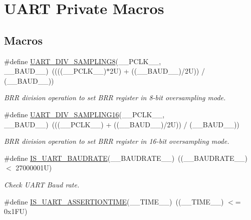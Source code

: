 \hypertarget{group___u_a_r_t___private___macros}{}\section{U\+A\+RT Private Macros}
\label{group___u_a_r_t___private___macros}
\subsection*{Macros}
\begin{DoxyCompactItemize}
\item 
\#define \mbox{\hyperlink{group___u_a_r_t___private___macros_ga3b4ab2ec164132268de4719de4625a82}{U\+A\+R\+T\+\_\+\+D\+I\+V\+\_\+\+S\+A\+M\+P\+L\+I\+N\+G8}}(\+\_\+\+\_\+\+P\+C\+L\+K\+\_\+\+\_\+,  \+\_\+\+\_\+\+B\+A\+U\+D\+\_\+\+\_\+)~((((\+\_\+\+\_\+\+P\+C\+L\+K\+\_\+\+\_\+)$\ast$2\+U) + ((\+\_\+\+\_\+\+B\+A\+U\+D\+\_\+\+\_\+)/2\+U)) / (\+\_\+\+\_\+\+B\+A\+U\+D\+\_\+\+\_\+))
\begin{DoxyCompactList}\small\item\em B\+RR division operation to set B\+RR register in 8-\/bit oversampling mode. \end{DoxyCompactList}\item 
\#define \mbox{\hyperlink{group___u_a_r_t___private___macros_gac2423ff86559eb91198bcc438caec865}{U\+A\+R\+T\+\_\+\+D\+I\+V\+\_\+\+S\+A\+M\+P\+L\+I\+N\+G16}}(\+\_\+\+\_\+\+P\+C\+L\+K\+\_\+\+\_\+,  \+\_\+\+\_\+\+B\+A\+U\+D\+\_\+\+\_\+)~(((\+\_\+\+\_\+\+P\+C\+L\+K\+\_\+\+\_\+) + ((\+\_\+\+\_\+\+B\+A\+U\+D\+\_\+\+\_\+)/2\+U)) / (\+\_\+\+\_\+\+B\+A\+U\+D\+\_\+\+\_\+))
\begin{DoxyCompactList}\small\item\em B\+RR division operation to set B\+RR register in 16-\/bit oversampling mode. \end{DoxyCompactList}\item 
\#define \mbox{\hyperlink{group___u_a_r_t___private___macros_gaa8f50c3cc4c04875ea490fb81a08731d}{I\+S\+\_\+\+U\+A\+R\+T\+\_\+\+B\+A\+U\+D\+R\+A\+TE}}(\+\_\+\+\_\+\+B\+A\+U\+D\+R\+A\+T\+E\+\_\+\+\_\+)~((\+\_\+\+\_\+\+B\+A\+U\+D\+R\+A\+T\+E\+\_\+\+\_\+) $<$ 27000001\+U)
\begin{DoxyCompactList}\small\item\em Check U\+A\+RT Baud rate. \end{DoxyCompactList}\item 
\#define \mbox{\hyperlink{group___u_a_r_t___private___macros_ga8acf6b6648717b7192439f1b426321a4}{I\+S\+\_\+\+U\+A\+R\+T\+\_\+\+A\+S\+S\+E\+R\+T\+I\+O\+N\+T\+I\+ME}}(\+\_\+\+\_\+\+T\+I\+M\+E\+\_\+\+\_\+)~((\+\_\+\+\_\+\+T\+I\+M\+E\+\_\+\+\_\+) $<$= 0x1\+F\+U)

\end{DoxyCompactItemize}
